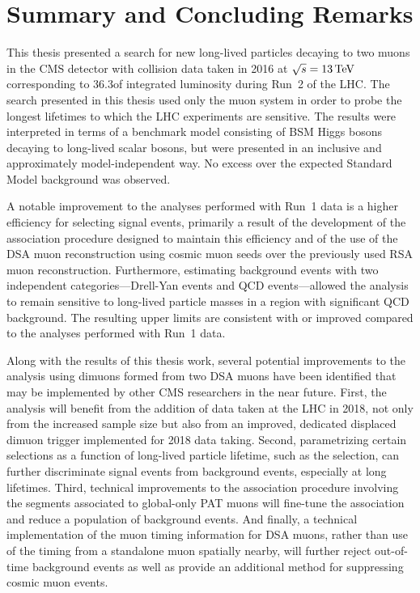 \chapter{Summary and Concluding Remarks}
\label{chap:conclusion}

This thesis presented a search for new long-lived particles decaying to two muons in the CMS detector with \pp collision data taken in 2016 at $\sqrt{s} = 13\,\text{Te\hspace{-.08em}V}$ corresponding to 36.3\fbinv of integrated luminosity during Run~2 of the LHC.
The search presented in this thesis used only the muon system in order to probe the longest lifetimes to which the LHC experiments are sensitive.
The results were interpreted in terms of a benchmark model consisting of BSM Higgs bosons decaying to long-lived scalar bosons, but were presented in an inclusive and approximately model-independent way.
No excess over the expected Standard Model background was observed.

A notable improvement to the analyses performed with Run~1 data \cite{EXO-12-037,CMS-PAS-EXO-14-012} is a higher efficiency for selecting signal events, primarily a result of the development of the \DSAToPAT association procedure designed to maintain this efficiency and of the use of the DSA muon reconstruction using cosmic muon seeds over the previously used RSA muon reconstruction.
Furthermore, estimating background events with two independent categories---Drell-Yan events and QCD events---allowed the analysis to remain sensitive to long-lived particle masses in a region with significant QCD background.
The resulting upper limits are consistent with or improved compared to the analyses performed with Run~1 data.

Along with the results of this thesis work, several potential improvements to the analysis using dimuons formed from two DSA muons have been identified that may be implemented by other CMS researchers in the near future.
First, the analysis will benefit from the addition of data taken at the LHC in 2018, not only from the increased sample size but also from an improved, dedicated displaced dimuon trigger implemented for 2018 data taking.
Second, parametrizing certain selections as a function of long-lived particle lifetime, such as the \LxySig selection, can further discriminate signal events from background events, especially at long lifetimes.
Third, technical improvements to the \DSAToPAT association procedure involving the segments associated to global-only PAT muons will fine-tune the association and reduce a population of background events.
And finally, a technical implementation of the muon timing information for DSA muons, rather than use of the timing from a standalone muon spatially nearby, will further reject out-of-time background events as well as provide an additional method for suppressing cosmic muon events.

